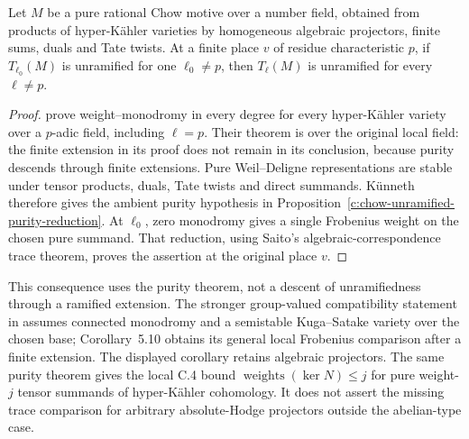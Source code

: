\begin{corollary}
\label{c:hyperkahler-chow-unramified}
Let $M$ be a pure rational Chow motive over a number field, obtained
from products of hyper-K\"ahler varieties by homogeneous algebraic
projectors, finite sums, duals and Tate twists.  At a finite place
$v$ of residue characteristic $p$, if $T_{\ell_0}(M)$ is unramified
for one $\ell_0\ne p$, then $T_\ell(M)$ is unramified for every
$\ell\ne p$.
\end{corollary}

\begin{proof}
\citet[Theorem~4.4, with Lemmas~4.2--4.3]{c_itozou2026}
prove weight--monodromy in every degree for every hyper-K\"ahler
variety over a $p$-adic field, including $\ell=p$.  Their theorem
is over the original local field: the finite extension in its proof
does not remain in its conclusion, because purity descends through
finite extensions.  Pure Weil--Deligne representations are stable
under tensor products, duals, Tate twists and direct summands.
K\"unneth therefore gives the ambient purity hypothesis in Proposition~\ref{c:chow-unramified-purity-reduction}.  At $\ell_0$, zero monodromy gives
a single Frobenius weight on the chosen pure summand.  That reduction,
using Saito's algebraic-correspondence trace theorem, proves the
assertion at the original place $v$.
\end{proof}

This consequence uses the purity theorem, not a descent of
unramifiedness through a ramified extension.  The stronger
group-valued compatibility statement in
\citet[Theorem~5.8 and Remark~5.9]{c_itozou2026} assumes connected
monodromy and a semistable Kuga--Satake variety over the chosen base;
Corollary~5.10 obtains its general local Frobenius comparison after
a finite extension.  The displayed corollary retains algebraic
projectors.  The same purity theorem gives the local C.4 bound
$\operatorname{weights}(\ker N)\le j$ for pure weight-$j$
tensor summands of hyper-K\"ahler cohomology.  It does not assert the missing trace comparison for
arbitrary absolute-Hodge projectors outside the abelian-type case.
